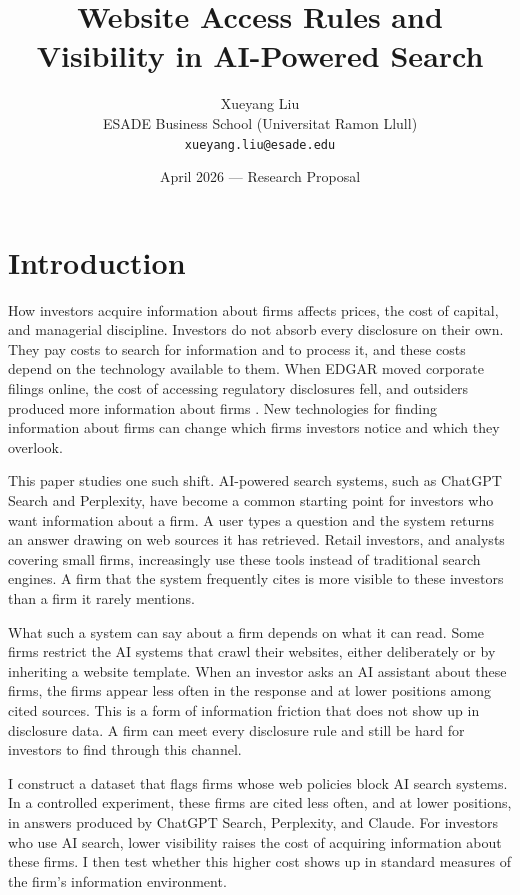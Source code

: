 \documentclass[11pt]{article}
\title{\vspace{-1cm}Website Access Rules and Visibility in AI-Powered Search}
\author{Xueyang Liu \\ ESADE Business School (Universitat Ramon Llull) \\ \texttt{xueyang.liu@esade.edu}}
\date{April 2026 --- Research Proposal}
\begin{document}
\maketitle

\vspace{-0.5cm}

\section{Introduction}

How investors acquire information about firms affects prices, the cost of
capital, and managerial discipline. Investors do not absorb every disclosure
on their own. They pay costs to search for information and to process it, and
these costs depend on the technology available to them. When EDGAR moved
corporate filings online, the cost of accessing regulatory disclosures fell,
and outsiders produced more information about firms \citep{gao2020informativeness,
goldstein2023edgar}. New technologies for finding information about firms
can change which firms investors notice and which they overlook.

This paper studies one such shift. AI-powered search systems, such as ChatGPT
Search and Perplexity, have become a common starting point for investors who
want information about a firm. A user types a question and the system returns
an answer drawing on web sources it has retrieved. Retail investors, and
analysts covering small firms, increasingly use these tools instead of
traditional search engines. A firm that the system frequently cites is more
visible to these investors than a firm it rarely mentions.

What such a system can say about a firm depends on what it can read. Some
firms restrict the AI systems that crawl their websites, either deliberately
or by inheriting a website template. When an investor asks an AI assistant
about these firms, the firms appear less often in the response and at lower
positions among cited sources. This is a form of information friction that
does not show up in disclosure data. A firm can meet every disclosure rule
and still be hard for investors to find through this channel.

I construct a dataset that flags firms whose web policies block AI search
systems. In a controlled experiment, these firms are cited less often, and
at lower positions, in answers produced by ChatGPT Search, Perplexity, and
Claude. For investors who use AI search, lower visibility raises the cost of
acquiring information about these firms. I then test whether this higher
cost shows up in standard measures of the firm's information environment.
\end{document}
